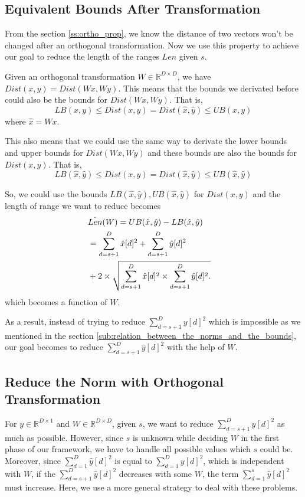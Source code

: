 \subsection{Equivalent Bounds After Transformation} %
\label{sub:equivalent_bounds_after_transformation}

From the section \ref{ss:ortho_prop}, we know the distance of two vectors won't be changed after an orthogonal transformation.  Now we use this property to achieve our goal to reduce the length of the ranges $Len$ given $s$.

Given an orthogonal transformation $W\in\mathbb{R}^{D\times D}$, we have $Dist(x,y)=Dist(Wx,Wy)$.  This means that the bounds we derivated before could also be the bounds for $Dist(Wx,Wy)$.  That is,
\[
LB(x,y)\leq Dist(x,y)=Dist(\hat{x},\hat{y}) \leq UB(x,y)
\]
where $\hat{x}=Wx$.

This also means that we could use the same way to derivate the lower bounds and upper bounds for $Dist(Wx,Wy)$ and these bounds are also the bounds for $Dist(x,y)$.  That is,
\[
LB(\hat{x},\hat{y})\leq Dist(x,y)=Dist(\hat{x},\hat{y}) \leq UB(\hat{x},\hat{y})
\]

So, we could use the bounds $LB(\hat{x},\hat{y}),UB(\hat{x},\hat{y})$ for $Dist(x,y)$ and the length of range we want to reduce becomes
{
\begin{eqnarray*}
\lefteqn{\hat{Len}(W) = UB(\hat{x},\hat{y}) - LB(\hat{x},\hat{y})} \\
& = \sum^D_{d=s+1}{\hat{x}[d]^2}+\sum^D_{d=s+1}{\hat{y}[d]^2} \notag \\
& +  2 \times \sqrt{\sum^D_{d=s+1}{\hat{x}[d]^2}\times \sum^D_{d=s+1}{\hat{y}[d]^2}.}\label{eq:len-range-hat}
\end{eqnarray*}
}
which becomes a function of $W$.

As a result, instead of trying to reduce $\sum^D_{d=s+1}{y[d]^2}$ which is impossible as we mentioned in the section \ref{sub:relation_between_the_norms_and_the_bounds}, our goal becomes to reduce $\sum^D_{d=s+1}{\hat{y}[d]^2}$ with the help of $W$.


\subsection{Reduce the Norm with Orthogonal Transformation} %
\label{ss:reduce_the_norm_with_orthogonal_transformation}

For $y\in \mathbb{R}^{D\times 1}$ and $W\in\mathbb{R}^{D\times D}$, given $s$, we want to reduce $\sum^D_{d=s+1}{\hat{y}[d]^2}$ as much as possible.  However, since $s$ is unknown while deciding $W$ in the first phase of our framework, we have to handle all possible values which $s$ could be.  Moreover, since $\sum^D_{d=1}{\hat{y}[d]^2}$ is equal to $\sum^D_{d=1}{y[d]^2}$, which is independent with $W$, if the $\sum^D_{d=s+1}{\hat{y}[d]^2}$ decreases with some $W$, the term $\sum^s_{d=1}{\hat{y}[d]^2}$ must increase.  Here, we use a more general strategy to deal with these problems.

